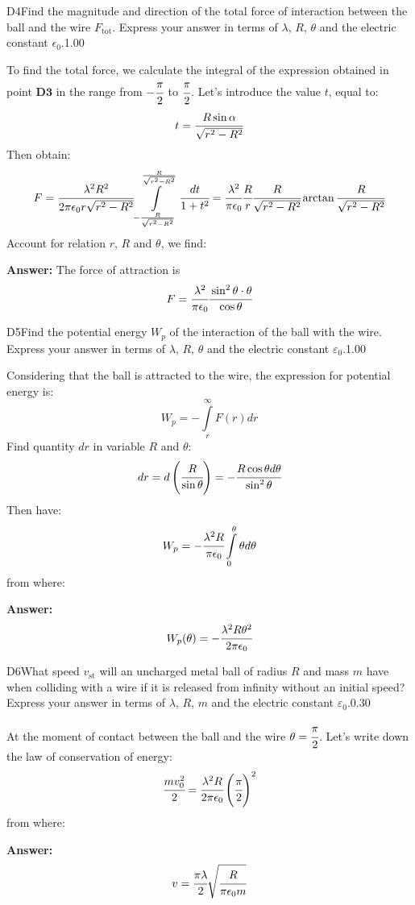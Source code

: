 \documentclass[11pt,a4paper]{article}
\begin{document}
\begin{solcard}{D4}{Find the magnitude and direction of the total force of interaction between the ball and the wire $F_\text{tot}$. Express your answer in terms of $\lambda$, $R$, $\theta$ and the electric constant $\epsilon_0$.}{1.00}

To find the total force, we calculate the integral of the expression obtained in point $\textbf{D3}$ in the range from $-\cfrac{\pi}{2}$ to $\cfrac{\pi}{2}$. Let's introduce the value $t$, equal to: $$t=\cfrac{R\sin\alpha}{\sqrt{r^2-R^2}} $$ Then obtain: $$F=\cfrac{\lambda^2R^2}{2\pi\epsilon_0r\sqrt{r^2-R^2}}\int\limits_{-\frac{R}{\sqrt{r^2-R^2}}}^{\frac{R}{\sqrt{r^2-R^2}}}\cfrac{dt}{1+t^2}=\cfrac{\lambda^2}{\pi\epsilon_0}\cfrac{R}{r}\cfrac{R}{\sqrt{r^2-R^2}}\arctan\cfrac{R}{\sqrt{r^2-R^2}} $$ Account for relation $r$, $R$ and $\theta$, we find:

\par\smallskip\noindent\textbf{Answer:} The force of attraction is $$F=\cfrac{\lambda^2}{\pi\epsilon_0}\cfrac{\sin^2\theta\cdot{\theta}}{\cos\theta} $$
\end{solcard}

\begin{solcard}{D5}{Find the potential energy $W_p$ of the interaction of the ball with the wire. Express your answer in terms of $\lambda$, $R$, $\theta$ and the electric constant $\varepsilon_0$.}{1.00}

Considering that the ball is attracted to the wire, the expression for potential energy is: $$W_p=-\int\limits_r^{\infty}F(r)dr $$ Find quantity $dr$ in variable $R$ and $\theta$: $$dr=d\left(\cfrac{R}{\sin\theta}\right)=-\cfrac{R\cos\theta d\theta}{\sin^2\theta} $$ Then have: $$W_p=-\cfrac{\lambda^2R}{\pi\epsilon_0}\int\limits_0^{\theta}\theta d\theta $$ from where:

\par\smallskip\noindent\textbf{Answer:} $$W_p(\theta)=-\cfrac{\lambda^2R\theta^2}{2\pi\epsilon_0} $$
\end{solcard}

\begin{solcard}{D6}{What speed $v_\text{st}$ will an uncharged metal ball of radius $R$ and mass $m$ have when colliding with a wire if it is released from infinity without an initial speed? Express your answer in terms of $\lambda$, $R$, $m$ and the electric constant $\varepsilon_0$.}{0.30}

At the moment of contact between the ball and the wire $\theta=\cfrac{\pi}{2}$. Let's write down the law of conservation of energy: $$\cfrac{mv^2_0}{2}=\cfrac{\lambda^2R}{2\pi\epsilon_0}\left(\cfrac{\pi}{2}\right)^2 $$ from where:

\par\smallskip\noindent\textbf{Answer:} $$v=\cfrac{\pi\lambda}{2}\sqrt{\cfrac{R}{\pi\epsilon_0m}} $$
\end{solcard}
\end{document}
